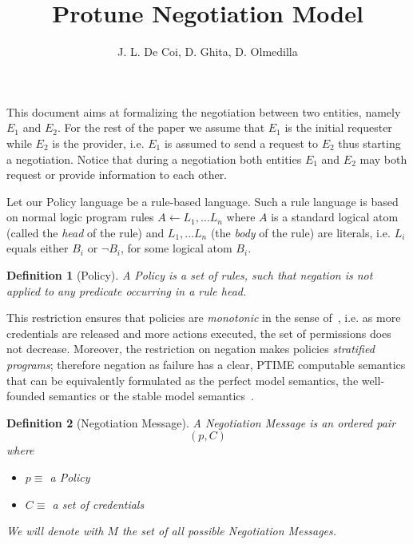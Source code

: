 \documentclass{article}
\begin{document}
\title{Protune Negotiation Model}
\author{J. L. De Coi, D. Ghita, D. Olmedilla}

\maketitle

\newtheorem{lemma}{Lemma}
\newtheorem{proposition}{Proposition}
\newtheorem{remark}{Remark}
\newtheorem{definition}{Definition} %
\newtheorem{exa}{Example}


This document aims at formalizing the negotiation between two entities, namely $E_1$ and $E_2$. For the rest of the paper we assume that $E_1$ is the initial requester while $E_2$ is the provider, i.e. $E_1$ is assumed to send a request to $E_2$ thus starting a negotiation. Notice that during a negotiation both entities $E_1$ and $E_2$ may both request or provide information to each other.

Let our Policy language be a rule-based language. Such a rule language is based on normal logic program rules $ A \leftarrow L_{1}, \ldots L_{n}$ where $A$ is a standard logical atom (called the \textit{head} of the rule) and $L_1, \ldots L_n$ (the \textit{body} of the rule) are literals, i.e. $L_{i}$ equals either $B_{i}$ or $\neg B_{i}$, for some logical atom $B_{i}$.

\begin{definition}[Policy]
A Policy is a set of rules, such that negation is not applied to any predicate occurring in a rule head.
\end{definition}

This restriction ensures that policies are \emph{monotonic} in the sense of~\cite{swyyj02}, i.e. as more credentials are released and more actions executed, the set of permissions does not decrease. Moreover, the restriction on negation makes policies \textit{stratified programs}; therefore negation as failure has a clear, PTIME computable semantics that can be equivalently formulated as the perfect model semantics, the well-founded semantics or the stable model semantics~\cite{baral-book}.

\begin{definition}[Negotiation Message]
A Negotiation Message is an ordered pair
$$(p, C)$$
where
  \begin{itemize}
	\item $p \equiv$ a Policy
	\item $C \equiv$ a set of credentials
  \end{itemize}
We will denote with $M$ the set of all possible Negotiation Messages.
\end{definition}
\end{document}
